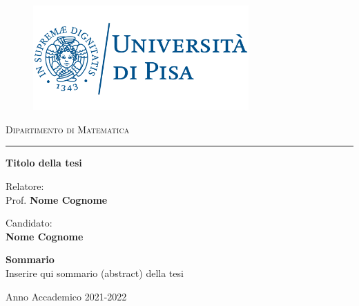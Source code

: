 	\thispagestyle{empty}
	\begin{figure}[ht]
		\centering
		\includegraphics[height=40mm]{0-frontpage/logo.png}
	\end{figure}

	\vspace{5mm}
	
	\begin{center}
		{\scshape \Large 
			Dipartimento di Matematica
		}

		\vspace{5mm}
		\rule{100mm}{0.1mm}
		\vspace{5mm}

		{\Huge \bf
			Titolo della tesi
		}
	\end{center}

	\vspace{15mm}
	\noindent
	\begin{minipage}[t]{0.5\textwidth}
		\begin{spacing}{1.2}
			Relatore:\\
			Prof. {\bf Nome Cognome}
		\end{spacing}
	\end{minipage}
	\hfill
	\begin{minipage}[t]{0.5\textwidth}
		\raggedleft

		\begin{spacing}{1.2}
			Candidato:\\
			{\bf Nome Cognome}
		\end{spacing}
	\end{minipage}


	\vspace{20mm}

	\begin{center}
		\begin{minipage}[t]{0.8\textwidth}
			\centering
			{\bf Sommario}\\
			\justifying
            Inserire qui sommario (abstract) della tesi
		\end{minipage}
        
		\vfill
		\large Anno Accademico 2021-2022
	\end{center}
\restoregeometry
